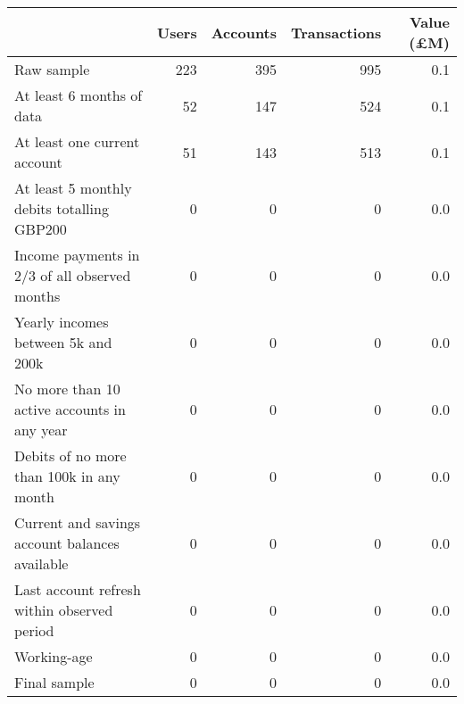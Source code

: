 \begin{tabular}{lrrrr}
\toprule
                                               & Users & Accounts & Transactions & Value (\pounds M) \\
\midrule
                                    Raw sample &   223 &      395 &          995 &               0.1 \\
                     At least 6 months of data &    52 &      147 &          524 &               0.1 \\
                  At least one current account &    51 &      143 &          513 &               0.1 \\
    At least 5 monthly debits totalling GBP200 &     0 &        0 &            0 &               0.0 \\
 Income payments in 2/3 of all observed months &     0 &        0 &            0 &               0.0 \\
            Yearly incomes between 5k and 200k &     0 &        0 &            0 &               0.0 \\
   No more than 10 active accounts in any year &     0 &        0 &            0 &               0.0 \\
      Debits of no more than 100k in any month &     0 &        0 &            0 &               0.0 \\
Current and savings account balances available &     0 &        0 &            0 &               0.0 \\
   Last account refresh within observed period &     0 &        0 &            0 &               0.0 \\
                                   Working-age &     0 &        0 &            0 &               0.0 \\
                                  Final sample &     0 &        0 &            0 &               0.0 \\
\bottomrule
\end{tabular}
